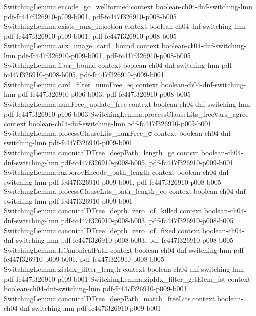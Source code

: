 \begin{theorem}
\proofstep
  {SwitchingLemma.encode_go_wellformed}
  {context}
  {boolean-ch04-dnf-switching-lmn}
  {pdf-fc447f326910-p009-b001,
    pdf-fc447f326910-p008-b005}
\proofstep
  {SwitchingLemma.exists_aux_injection}
  {context}
  {boolean-ch04-dnf-switching-lmn}
  {pdf-fc447f326910-p009-b001,
    pdf-fc447f326910-p008-b005}
\proofstep
  {SwitchingLemma.aux_image_card_bound}
  {context}
  {boolean-ch04-dnf-switching-lmn}
  {pdf-fc447f326910-p009-b001,
    pdf-fc447f326910-p008-b005}
\proofstep
  {SwitchingLemma.fiber_bound}
  {context}
  {boolean-ch04-dnf-switching-lmn}
  {pdf-fc447f326910-p008-b005,
    pdf-fc447f326910-p009-b001}
\proofstep
  {SwitchingLemma.card_filter_numFree_eq}
  {context}
  {boolean-ch04-dnf-switching-lmn}
  {pdf-fc447f326910-p006-b003,
    pdf-fc447f326910-p008-b005}
\proofstep
  {SwitchingLemma.numFree_update_free}
  {context}
  {boolean-ch04-dnf-switching-lmn}
  {pdf-fc447f326910-p006-b003}
\proofstep
  {SwitchingLemma.processClauseLits_freeVars_agree}
  {context}
  {boolean-ch04-dnf-switching-lmn}
  {pdf-fc447f326910-p009-b001}
\proofstep
  {SwitchingLemma.processClauseLits_numFree_σ}
  {context}
  {boolean-ch04-dnf-switching-lmn}
  {pdf-fc447f326910-p009-b001}
\proofstep
  {SwitchingLemma.canonicalDTree_deepPath_length_ge}
  {context}
  {boolean-ch04-dnf-switching-lmn}
  {pdf-fc447f326910-p008-b005,
    pdf-fc447f326910-p009-b001}
\proofstep
  {SwitchingLemma.razborovEncode_path_length}
  {context}
  {boolean-ch04-dnf-switching-lmn}
  {pdf-fc447f326910-p009-b001,
    pdf-fc447f326910-p008-b005}
\proofstep
  {SwitchingLemma.processClauseLits_path_length_eq}
  {context}
  {boolean-ch04-dnf-switching-lmn}
  {pdf-fc447f326910-p009-b001}
\proofstep
  {SwitchingLemma.canonicalDTree_depth_zero_of_killed}
  {context}
  {boolean-ch04-dnf-switching-lmn}
  {pdf-fc447f326910-p008-b003,
    pdf-fc447f326910-p008-b005}
\proofstep
  {SwitchingLemma.canonicalDTree_depth_zero_of_fixed}
  {context}
  {boolean-ch04-dnf-switching-lmn}
  {pdf-fc447f326910-p008-b003,
    pdf-fc447f326910-p008-b005}
\proofstep
  {SwitchingLemma.IsCanonicalPath}
  {context}
  {boolean-ch04-dnf-switching-lmn}
  {pdf-fc447f326910-p009-b001,
    pdf-fc447f326910-p008-b005}
\proofstep
  {SwitchingLemma.zipIdx_filter_length}
  {context}
  {boolean-ch04-dnf-switching-lmn}
  {pdf-fc447f326910-p009-b001}
\proofstep
  {SwitchingLemma.zipIdx_filter_getElem_fst}
  {context}
  {boolean-ch04-dnf-switching-lmn}
  {pdf-fc447f326910-p009-b001}
\proofstep
  {SwitchingLemma.canonicalDTree_deepPath_match_freeLits}
  {context}
  {boolean-ch04-dnf-switching-lmn}
  {pdf-fc447f326910-p009-b001}

\end{theorem}
